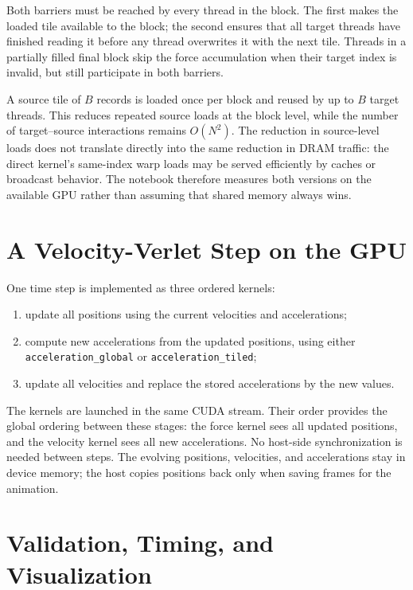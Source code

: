 Both barriers must be reached by every thread in the block. The first makes
the loaded tile available to the block; the second ensures that all target
threads have finished reading it before any thread overwrites it with the
next tile. Threads in a partially filled final block skip the force
accumulation when their target index is invalid, but still participate in
both barriers.

A source tile of $B$ records is loaded once per block and reused by up to $B$
target threads. This reduces repeated source loads at the block level, while
the number of target--source interactions remains $O(N^2)$. The reduction in
source-level loads does not translate directly into the same reduction in
DRAM traffic: the direct kernel's same-index warp loads may be served
efficiently by caches or broadcast behavior. The notebook therefore measures
both versions on the available GPU rather than assuming that shared memory
always wins.

\section{A Velocity-Verlet Step on the GPU}
\label{sec:nbody-device-loop}

One time step is implemented as three ordered kernels:
\begin{enumerate}
    \item update all positions using the current velocities and accelerations;
    \item compute new accelerations from the updated positions, using either
          \lstinline|acceleration_global| or
          \lstinline|acceleration_tiled|;
    \item update all velocities and replace the stored accelerations by the
          new values.
\end{enumerate}
The kernels are launched in the same CUDA stream. Their order provides the
global ordering between these stages: the force kernel sees all updated
positions, and the velocity kernel sees all new accelerations. No host-side
synchronization is needed between steps. The evolving positions, velocities,
and accelerations stay in device memory; the host copies positions back only
when saving frames for the animation.

\section{Validation, Timing, and Visualization}
\label{sec:nbody-validation}

